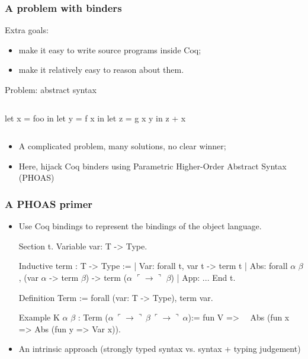 \documentclass[9pt]{beamer}
\begin{document}
\begin{frame}[fragile]
  \frametitle{A problem with binders}
  
  \alert{Extra goals:}
  \begin{itemize}
  \item make it easy to write source programs inside Coq;
  \item make it relatively easy to reason about them. 
  \end{itemize}

  \alert{Problem: abstract syntax}
\begin{center}
\vspace{-1em}
  \begin{columns}
\begin{ocaml}
let x = foo in 
let y = f x in 
let z = g x y in 
z + x
\end{ocaml}
\end{columns}
\end{center}

\pause 
\begin{itemize}
\item A complicated problem, many solutions, no clear winner;
\item Here, hijack Coq binders using Parametric Higher-Order
  Abstract Syntax (PHOAS)
\end{itemize}
\end{frame}


\begin{frame}[fragile]
  \frametitle{A PHOAS primer}
  \begin{itemize}
  \item Use Coq bindings to represent the bindings of the object language.
    \newcommand\arrow{\ulcorner \to \urcorner}
\begin{coq}
Section t. 
  Variable var: T -> Type.
  
  Inductive term : T -> Type :=
  | Var: forall t, var t -> term t
  | Abs: forall $\alpha$ $\beta$, (var $\alpha$ -> term $\beta$) -> term ($\alpha$ $\arrow$ $\beta$)
  | App: ...
End t. 

Definition Term := forall (var: T -> Type), term var. 

Example K $\alpha$ $\beta$ : Term ($\alpha~\arrow{}~\beta{}~\arrow{}~\alpha$):= fun V =>
$\quad$Abs (fun x => Abs (fun y => Var x)).
\end{coq}

\pause

\item An \alert{intrinsic approach} (strongly typed syntax vs. syntax + typing judgement)
\end{itemize}
\end{frame}
\end{document}
